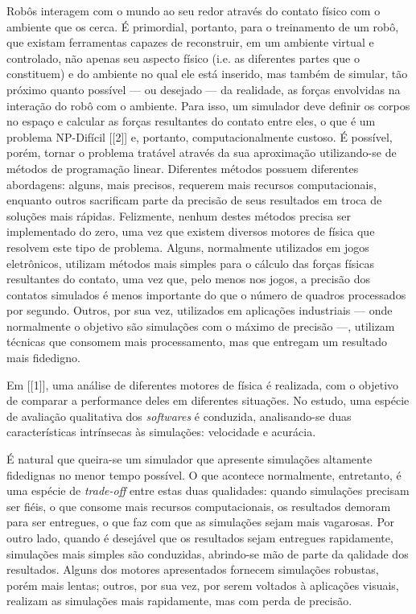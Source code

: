 \documentclass[cic,tc]{iiufrgs}
\begin{document}
Robôs interagem com o mundo ao seu redor através do contato físico com o
ambiente que os cerca. É primordial, portanto, para o treinamento de um robô,
que existam ferramentas capazes
de reconstruir, em um ambiente virtual e controlado, não apenas seu aspecto
físico (i.e. as diferentes partes que o constituem) e do ambiente no qual ele
está inserido, mas também de simular, tão próximo quanto possível --- ou
desejado --- da realidade, as forças envolvidas na interação do robô com o
ambiente. Para isso, um simulador deve definir os corpos no espaço e calcular
as forças resultantes do contato entre eles, o que é um problema NP-Difícil [[2]]
e, portanto, computacionalmente custoso.
É possível, porém, tornar o problema tratável através da sua aproximação
utilizando-se de métodos de programação linear. Diferentes métodos possuem
diferentes abordagens: alguns, mais precisos, requerem mais recursos
computacionais, enquanto outros sacrificam parte da precisão de seus resultados
em troca de soluções mais rápidas. Felizmente, nenhum destes métodos precisa ser
implementado do zero, uma vez que existem diversos motores de física que
resolvem este tipo de problema. Alguns, normalmente utilizados em jogos
eletrônicos, utilizam métodos mais simples para o cálculo das forças
físicas resultantes do contato, uma vez que, pelo menos nos jogos, a precisão
dos contatos simulados é menos importante do que o número de quadros processados
por segundo. Outros, por sua vez, utilizados em aplicações industriais --- onde
normalmente o objetivo são simulações com o máximo de precisão ---, utilizam
técnicas que consomem mais processamento, mas que entregam um resultado mais
fidedigno.


Em [[1]], uma análise de diferentes motores de física é realizada, com o
objetivo de comparar a performance deles em diferentes situações. No estudo,
uma espécie de avaliação qualitativa dos \textit{softwares} é conduzida,
analisando-se duas características intrínsecas às simulações: velocidade e
acurácia.


É natural que queira-se um simulador que apresente simulações altamente
fidedignas no menor tempo possível. O que acontece normalmente, entretanto, é
uma espécie de \textit{trade-off} entre estas duas qualidades: quando simulações
precisam ser fiéis, o que consome mais recursos computacionais, os resultados
demoram para ser entregues, o que faz com que as simulações sejam mais
vagarosas. Por outro lado, quando é desejável que os resultados sejam entregues
rapidamente, simulações mais simples são conduzidas, abrindo-se mão de parte da
qalidade dos resultados. Alguns dos motores apresentados fornecem simulações
robustas, porém mais lentas; outros, por sua vez, por serem voltados à
aplicações visuais, realizam as simulações mais rapidamente, mas com perda de
precisão.
\end{document}

